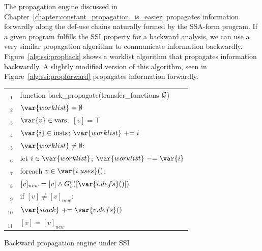 The propagation engine discussed in Chapter~\ref{chapter:constant_propagation_is_easier} propagates information forwardly along the def-use chains naturally formed by the SSA-form program.
If a given program fulfills the SSI property for a backward analysis, we can use a very similar propagation algorithm to communicate information backwardly.
Figure~\ref{alg:ssi:propback} shows a worklist algorithm that propagates information backwardly.
A slightly modified version of this algorithm, seen in Figure~\ref{alg:ssi:propforward} propagates information forwardly.


\def\1{\qquad}
\def\2{\1\1}
\def\3{\2\1}
\def\4{\2\2}
\def\5{\3\2}
\def\6{\4\2}
\def\7{\5\2}
\def\8{\6\2}
\def\9{\7\2}
\def\If{{\sf  if }}
\def\Let{{\sf  let }}
\def\Then{{\sf  then }}
\def\Else{{\sf  else}}
\def\Foreach{{\sf foreach }}
\def\For{{\sf for }}
\def\While{{\sf while }}


\newcommand\val[1]{[#1]}
\begin{algorithm}[t!]
\begin{tabular}{rl}
$_1$ & \textsf{function back\_propagate}(transfer\_functions $\cal G$)\\
$_2$ & \1$\var{worklist} = \emptyset$\\
$_3$ & \1\Foreach $\var{v} \in \textrm{vars}$: $\val{v}=\top$\\
$_4$ & \1\Foreach $\var{i} \in \textrm{insts}$: $\var{worklist}\ +\hspace{-0.3em}= i$\\
$_5$ & \1\While $\var{worklist}\neq \emptyset$:\\
$_6$ & \1\1 \Let $i \in \var{worklist}$; $\var{worklist}\ -\hspace{-0.3em}= \var{i}$\\
$_7$ & \1\1 \Foreach $v \in \var{i.uses}()$:\\
$_8$ & \1  \2  $\val{v}_{new} = \val{v} \wedge G_v^i(\val{\var{i.defs}()})$\\
$_9$ &  \1 \2  \If $\val{v} \neq \val{v}_{new}$: \\
$_{10}$& \1   \3 $\var{stack}\ +\hspace{-0.3em}=\var{v.defs}()$\\
$_{11}$& \1   \3 $\val{v} = \val{v}_{new}$\\
\end{tabular}
\caption{\label{alg:ssi:propback} Backward propagation engine under SSI}
\end{algorithm}

